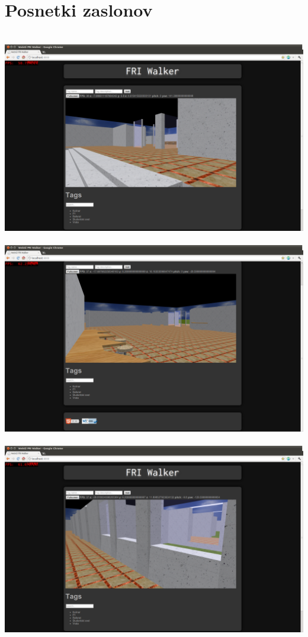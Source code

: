 \documentclass[10pt,a4paper]{article}
\begin{document}
\section{Posnetki zaslonov}
\ \\
\includegraphics[scale=0.3]{screen1.png}\\ 
\ \\
\includegraphics[scale=0.3]{screen2.png}\\
\ \\
\includegraphics[scale=0.3]{screen3.png}\\
\end{document}
